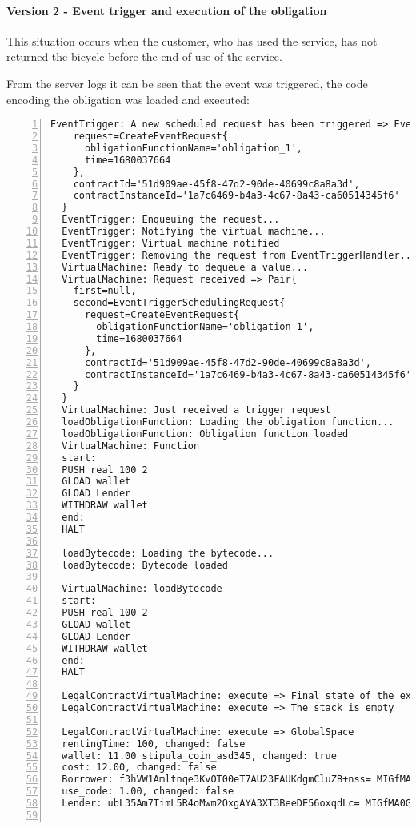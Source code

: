 \newpage
\paragraph{Version 2 - Event trigger and execution of the obligation}

This situation occurs when the customer, who has used the service, has not returned the bicycle before the 
end of use of the service.

From the server logs it can be seen that the event was triggered, the code encoding the obligation was 
loaded and executed:
\begin{Verbatim}[numbers=left,xleftmargin=1cm,firstnumber=1,breaklines=true,breakanywhere=true,tabsize=2]
  EventTrigger: A new scheduled request has been triggered => EventTriggerSchedulingRequest{
    request=CreateEventRequest{
      obligationFunctionName='obligation_1', 
      time=1680037664
    }, 
    contractId='51d909ae-45f8-47d2-90de-40699c8a8a3d', 
    contractInstanceId='1a7c6469-b4a3-4c67-8a43-ca60514345f6'
  }
  EventTrigger: Enqueuing the request...
  EventTrigger: Notifying the virtual machine...
  EventTrigger: Virtual machine notified
  EventTrigger: Removing the request from EventTriggerHandler...
  VirtualMachine: Ready to dequeue a value...
  VirtualMachine: Request received => Pair{
    first=null, 
    second=EventTriggerSchedulingRequest{
      request=CreateEventRequest{
        obligationFunctionName='obligation_1', 
        time=1680037664
      }, 
      contractId='51d909ae-45f8-47d2-90de-40699c8a8a3d', 
      contractInstanceId='1a7c6469-b4a3-4c67-8a43-ca60514345f6'
    }
  }
  VirtualMachine: Just received a trigger request
  loadObligationFunction: Loading the obligation function...
  loadObligationFunction: Obligation function loaded
  VirtualMachine: Function
  start:
  PUSH real 100 2
  GLOAD wallet
  GLOAD Lender
  WITHDRAW wallet
  end:
  HALT

  loadBytecode: Loading the bytecode...
  loadBytecode: Bytecode loaded

  VirtualMachine: loadBytecode
  start:
  PUSH real 100 2
  GLOAD wallet
  GLOAD Lender
  WITHDRAW wallet
  end:
  HALT

  LegalContractVirtualMachine: execute => Final state of the execution below
  LegalContractVirtualMachine: execute => The stack is empty

  LegalContractVirtualMachine: execute => GlobalSpace
  rentingTime: 100, changed: false
  wallet: 11.00 stipula_coin_asd345, changed: true
  cost: 12.00, changed: false
  Borrower: f3hVW1Amltnqe3KvOT00eT7AU23FAUKdgmCluZB+nss= MIGfMA0GCSqGSIb3DQEBAQUAA4GNADCBiQKBgQDErzzgD2ZslZxciFAiX3/ot7lrkZDw4148jFZrsDZPE6CVs9xXFSHGgy/mFvIFLXhnChO6Nyd2be3lbgeavLMCMVUiTStXr117Km17keWpb3sItkKKsLFBOcIIU8XXowI/OhzQN2XPZYESHgjdQ5vwEj2YyueiS7WKP94YWz/pswIDAQAB, changed: false
  use_code: 1.00, changed: false
  Lender: ubL35Am7TimL5R4oMwm2OxgAYA3XT3BeeDE56oxqdLc= MIGfMA0GCSqGSIb3DQEBAQUAA4GNADCBiQKBgQCo/GjVKS+3gAA55+kko41yINdOcCLQMSBQyuTTkKHE1mhu/TgOpivM0wLPsSga8hQMr3+v3aR0IF/vfCRf6SdiXmWx/jflmEXtnT6fkGcnV6dGNUpHWXSpwUIDt0N88jfnEqekx4S+KDCKg99sGEeHeT65fKS8lB0gjHMt9AOriwIDAQAB, changed: false


\end{Verbatim}
